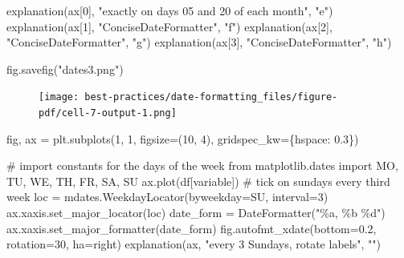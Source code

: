 \documentclass[
  letterpaper,
  DIV=11,
  numbers=noendperiod,
  oneside]{scrreprt}
\newenvironment{Shaded}{\begin{snugshade}}{\end{snugshade}}
\newcommand{\CommentTok}[1]{\textcolor[rgb]{0.37,0.37,0.37}{#1}}
\newcommand{\DecValTok}[1]{\textcolor[rgb]{0.68,0.00,0.00}{#1}}
\newcommand{\FloatTok}[1]{\textcolor[rgb]{0.68,0.00,0.00}{#1}}
\newcommand{\ImportTok}[1]{\textcolor[rgb]{0.00,0.46,0.62}{#1}}
\newcommand{\NormalTok}[1]{\textcolor[rgb]{0.00,0.23,0.31}{#1}}
\newcommand{\OperatorTok}[1]{\textcolor[rgb]{0.37,0.37,0.37}{#1}}
\newcommand{\SpecialCharTok}[1]{\textcolor[rgb]{0.37,0.37,0.37}{#1}}
\newcommand{\StringTok}[1]{\textcolor[rgb]{0.13,0.47,0.30}{#1}}
\begin{document}
\begin{Shaded}
\begin{Highlighting}[]
\NormalTok{explanation(ax[}\DecValTok{0}\NormalTok{], }\StringTok{"exactly on days 05 and 20 of each month"}\NormalTok{, }\StringTok{"e"}\NormalTok{)}
\NormalTok{explanation(ax[}\DecValTok{1}\NormalTok{], }\StringTok{"ConciseDateFormatter"}\NormalTok{, }\StringTok{"f"}\NormalTok{)}
\NormalTok{explanation(ax[}\DecValTok{2}\NormalTok{], }\StringTok{"ConciseDateFormatter"}\NormalTok{, }\StringTok{"g"}\NormalTok{)}
\NormalTok{explanation(ax[}\DecValTok{3}\NormalTok{], }\StringTok{"ConciseDateFormatter"}\NormalTok{, }\StringTok{"h"}\NormalTok{)}

\NormalTok{fig.savefig(}\StringTok{"dates3.png"}\NormalTok{)}
\end{Highlighting}
\end{Shaded}

\begin{figure}[H]

{\centering \texttt{[image: best-practices/date-formatting\_files/figure-pdf/cell-7-output-1.png]}

}

\end{figure}

\begin{Shaded}
\begin{Highlighting}[]
\NormalTok{fig, ax }\OperatorTok{=}\NormalTok{ plt.subplots(}\DecValTok{1}\NormalTok{, }\DecValTok{1}\NormalTok{, figsize}\OperatorTok{=}\NormalTok{(}\DecValTok{10}\NormalTok{, }\DecValTok{4}\NormalTok{),}
\NormalTok{                       gridspec\_kw}\OperatorTok{=}\NormalTok{\{}\StringTok{\textquotesingle{}hspace\textquotesingle{}}\NormalTok{: }\FloatTok{0.3}\NormalTok{\})}

\CommentTok{\# import constants for the days of the week}
\ImportTok{from}\NormalTok{ matplotlib.dates }\ImportTok{import}\NormalTok{ MO, TU, WE, TH, FR, SA, SU}
\NormalTok{ax.plot(df[}\StringTok{\textquotesingle{}variable\textquotesingle{}}\NormalTok{])}
\CommentTok{\# tick on sundays every third week}
\NormalTok{loc }\OperatorTok{=}\NormalTok{ mdates.WeekdayLocator(byweekday}\OperatorTok{=}\NormalTok{SU, interval}\OperatorTok{=}\DecValTok{3}\NormalTok{)}
\NormalTok{ax.xaxis.set\_major\_locator(loc)}
\NormalTok{date\_form }\OperatorTok{=}\NormalTok{ DateFormatter(}\StringTok{"\%a, \%b }\SpecialCharTok{\%d}\StringTok{"}\NormalTok{)}
\NormalTok{ax.xaxis.set\_major\_formatter(date\_form)}
\NormalTok{fig.autofmt\_xdate(bottom}\OperatorTok{=}\FloatTok{0.2}\NormalTok{, rotation}\OperatorTok{=}\DecValTok{30}\NormalTok{, ha}\OperatorTok{=}\StringTok{\textquotesingle{}right\textquotesingle{}}\NormalTok{)}
\NormalTok{explanation(ax, }\StringTok{"every 3 Sundays, rotate labels"}\NormalTok{, }\StringTok{""}\NormalTok{)}
\end{Highlighting}
\end{Shaded}
\end{document}
